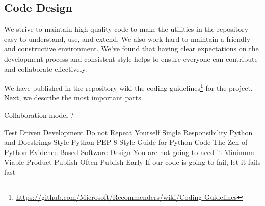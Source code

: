 \subsection{Code Design}

We strive to maintain high quality code to make the utilities in the repository easy to 
understand, use, and extend. We also work hard to maintain a friendly and constructive 
environment. We've found that having clear expectations on the development process 
and consistent style helps to ensure everyone can contribute and collaborate effectively.

We have published in the repository wiki the coding 
guidelines\footnote{\url{https://github.com/Microsoft/Recommenders/wiki/Coding-Guidelines}} 
for the project. Next, we describe the most important parts.



Collaboration model ?

Test Driven Development
Do not Repeat Yourself
Single Responsibility
Python and Docstrings Style
Python PEP 8 Style Guide for Python Code
The Zen of Python
Evidence-Based Software Design
You are not going to need it
Minimum Viable Product
Publish Often Publish Early
If our code is going to fail, let it fails fast


